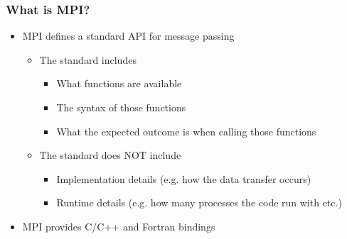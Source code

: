 \documentclass[9pt,c]{beamer}
\begin{document}
\begin{frame}
  \frametitle{What is MPI?}
  \begin{itemize}
    \item MPI defines a standard API for message passing
      \begin{itemize}
        \item The standard includes
          \begin{itemize}
          \item What functions are available
          \item The syntax of those functions
          \item What the expected outcome is when calling those functions
          \end{itemize}
        \item The standard does NOT include
          \begin{itemize}
            \item Implementation details (e.g. how the data transfer occurs)
            \item Runtime details (e.g. how many processes the code run with  etc.)
          \end{itemize}
      \end{itemize}
    \item MPI provides C/C++ and Fortran bindings
  \end{itemize}
\end{frame}
\end{document}
